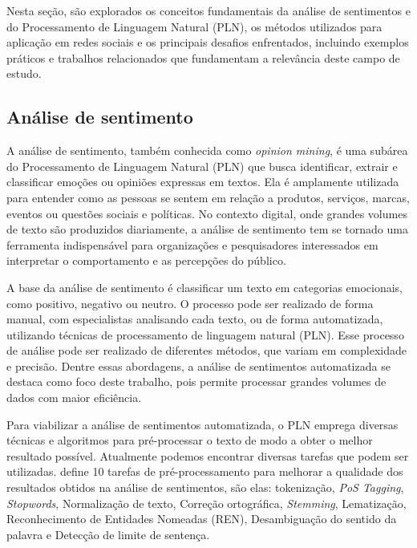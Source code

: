 \documentclass[
	12pt,				%
	oneside,			%
	a4paper,			%
	english,			%
	french,				%
	spanish,			%
	brazil				%
	]{abntex2}
\begin{document}
Nesta seção, são explorados os conceitos fundamentais da análise de
sentimentos e do Processamento de Linguagem Natural (PLN), os métodos
utilizados para aplicação em redes sociais e os principais desafios
enfrentados, incluindo exemplos práticos e trabalhos relacionados que
fundamentam a relevância deste campo de estudo.

\hypertarget{anuxe1lise-de-sentimento}{%
\subsection{Análise de sentimento}\label{anuxe1lise-de-sentimento}}

A análise de sentimento, também conhecida como \emph{opinion mining}, é
uma subárea do Processamento de Linguagem Natural (PLN) que busca
identificar, extrair e classificar emoções ou opiniões expressas em
textos. Ela é amplamente utilizada para entender como as pessoas se
sentem em relação a produtos, serviços, marcas, eventos ou questões
sociais e políticas. No contexto digital, onde grandes volumes de texto
são produzidos diariamente, a análise de sentimento tem se tornado uma
ferramenta indispensável para organizações e pesquisadores interessados
em interpretar o comportamento e as percepções do público.

A base da análise de sentimento é classificar um texto em categorias
emocionais, como positivo, negativo ou neutro. O processo pode ser
realizado de forma manual, com especialistas analisando cada texto, ou
de forma automatizada, utilizando técnicas de processamento de linguagem
natural (PLN). Esse processo de análise pode ser realizado de diferentes
métodos, que variam em complexidade e precisão. Dentre essas abordagens,
a análise de sentimentos automatizada se destaca como foco deste
trabalho, pois permite processar grandes volumes de dados com maior
eficiência.

Para viabilizar a análise de sentimentos automatizada, o PLN emprega
diversas técnicas e algoritmos para pré-processar o texto de modo a
obter o melhor resultado possível. Atualmente podemos encontrar diversas
tarefas que podem ser utilizadas. 
define 10 tarefas de pré-processamento para melhorar a qualidade dos
resultados obtidos na análise de sentimentos, são elas: tokenização,
\emph{PoS Tagging}, \emph{Stopwords}, Normalização de texto, Correção
ortográfica, \emph{Stemming}, Lematização, Reconhecimento de Entidades
Nomeadas (REN), Desambiguação do sentido da palavra e Detecção de limite
de sentença.
\end{document}
